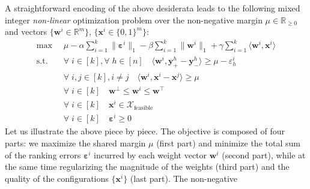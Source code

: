 \documentclass{article}
\renewcommand\[{\begin{equation}}
\renewcommand\]{\end{equation}}
\newcommand{\bbR}{\mathbb{R}}
\newcommand{\calvar}[1]{\ensuremath{\mathcal{#1}}}
\newcommand{\calX}{\calvar{X}}
\newcommand{\vecvar}[1]{\ensuremath{\boldsymbol{#1}}}
\newcommand{\vw}{\vecvar{w}}
\newcommand{\vx}{\vecvar{x}}
\newcommand{\vy}{\vecvar{y}}
\newcommand{\veps}{\vecvar{\varepsilon}}
\DeclareMathOperator*{\argmax}{argmax}
\begin{document}

A straightforward encoding of the above desiderata leads to the
following mixed integer {\em non-linear} optimization problem over the
non-negative margin $\mu \in \bbR_{\ge 0}$ and vectors $\{ \vw^i \in \bbR^m \}$, $\{ \vx^i \in \{0,1\}^m \}$:
%
{\footnotesize
\begin{align}
    \max
        & \;\; \mu - \alpha \sum_{i=1}^k \| \veps^{i} \|_1 - \beta \sum_{i=1}^k \| \vw^{i} \|_1 + \gamma \sum_{i=1}^k \langle \vw^{i}, \vx^{i} \rangle
        \nonumber
    \\
    \text{s.t.}
        & \;\; \forall \; i \in [k], \forall \; h \in [n] \quad \langle \vw^{i}, \vy^{h}_+ - \vy^{h}_- \rangle \ge \mu - \varepsilon^{i}_h \label{eq:wyconstr}
    \\
        & \;\; \forall \; i, j \in [k], i \neq j \quad \langle \vw^{i}, \vx^{i} - \vx^{j} \rangle \ge \mu \label{eq:wxconstr}
    \\
        & \;\; \forall \; i \in [k] \quad \vw^\bot \le \vw^{i} \le \vw^\top \label{eq:wbounds}
    \\
        & \;\; \forall \; i \in [k] \quad \vx^{i} \in \calX_{\text{feasible}} \label{eq:xbounds}
    \\
        & \;\; \forall \; i \in [k] \quad \veps^{i} \ge 0 \nonumber
\end{align}
}
%
Let us illustrate the above piece by piece. The objective is composed
of four parts: we maximize the shared margin $\mu$ (first part) and
minimize the total sum of the ranking errors $\veps^i$ incurred by
each weight vector $\vw^{i}$ (second part), while at the same time
regularizing the magnitude of the weights (third part) and the quality
of the configurations $\{ \vx^{i} \}$ (last part). The non-negative
\end{document}
